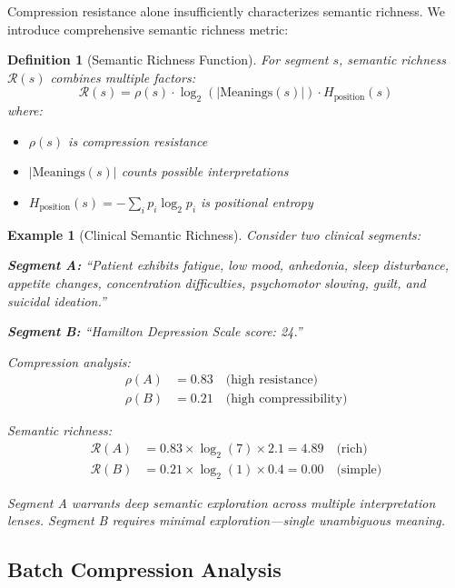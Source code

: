 \documentclass[12pt,a4paper]{article}
\newtheorem{definition}{Definition}
\newtheorem{example}{Example}
\begin{document}
Compression resistance alone insufficiently characterizes semantic richness. We introduce comprehensive semantic richness metric:

\begin{definition}[Semantic Richness Function]
For segment $s$, semantic richness $\mathcal{R}(s)$ combines multiple factors:
\begin{equation}
\mathcal{R}(s) = \rho(s) \cdot \log_2(|\text{Meanings}(s)|) \cdot H_{\text{position}}(s)
\end{equation}
where:
\begin{itemize}
\item $\rho(s)$ is compression resistance
\item $|\text{Meanings}(s)|$ counts possible interpretations
\item $H_{\text{position}}(s) = -\sum_i p_i \log_2 p_i$ is positional entropy
\end{itemize}
\end{definition}

\begin{example}[Clinical Semantic Richness]
Consider two clinical segments:

\textbf{Segment A:} ``Patient exhibits fatigue, low mood, anhedonia, sleep disturbance, appetite changes, concentration difficulties, psychomotor slowing, guilt, and suicidal ideation.''

\textbf{Segment B:} ``Hamilton Depression Scale score: 24.''

Compression analysis:
\begin{align}
\rho(A) &= 0.83 \quad \text{(high resistance)} \\
\rho(B) &= 0.21 \quad \text{(high compressibility)}
\end{align}

Semantic richness:
\begin{align}
\mathcal{R}(A) &= 0.83 \times \log_2(7) \times 2.1 = 4.89 \quad \text{(rich)} \\
\mathcal{R}(B) &= 0.21 \times \log_2(1) \times 0.4 = 0.00 \quad \text{(simple)}
\end{align}

Segment A warrants deep semantic exploration across multiple interpretation lenses. Segment B requires minimal exploration—single unambiguous meaning.
\end{example}

\subsection{Batch Compression Analysis}
\end{document}
